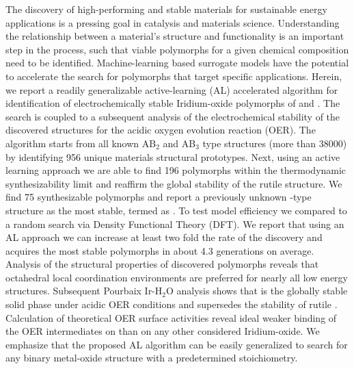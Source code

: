 %


%
\noindent The discovery of high-performing and stable materials for sustainable energy applications is a pressing goal in catalysis and materials science.
%
Understanding the relationship between a material's structure and functionality is an important step in the process, such that viable polymorphs for a given chemical composition need to be identified.
%
Machine-learning based surrogate models have the potential to accelerate the search for polymorphs that target specific applications.
%
Herein, we report a readily generalizable active-learning (AL) accelerated algorithm for identification of electrochemically stable Iridium-oxide polymorphs of \IrOtwo and \IrOthree.
%
The search is coupled to a subsequent analysis of the electrochemical stability of the discovered structures for the acidic oxygen evolution reaction (OER).
%
The algorithm starts from all known AB$_2$ and AB$_3$ type structures (more than \num{38000}) by identifying 956 unique materials structural prototypes.
%
Next, using an active learning approach we are able to find \num{196} \IrOtwo polymorphs within the thermodynamic synthesizability limit and reaffirm the global stability of the rutile structure.
%
We find \num{75} synthesizable \IrOthree polymorphs and report a previously unknown -type structure as the most stable, termed as \aIrOthree.
%
To test model efficiency we compared to a random search via Density Functional Theory (DFT).
%
We report that using an AL approach we can increase at least two fold the rate of the discovery and acquires the most stable polymorphs in about \num{4.3} generations on average.
%
Analysis of the structural properties of discovered polymorphs reveals that octahedral local coordination environments are preferred for nearly all low energy structures.
%
Subsequent Pourbaix Ir-H$_2$O analysis shows that \aIrOthree is the globally stable solid phase under acidic OER conditions and supersedes the stability of rutile \IrOtwo.
%
Calculation of theoretical OER surface activities reveal ideal weaker binding of the OER intermediates on \aIrOthree than on any other considered Iridium-oxide.
%
We emphasize that the proposed AL algorithm  can be easily generalized to search for any binary metal-oxide structure with a predetermined stoichiometry.

